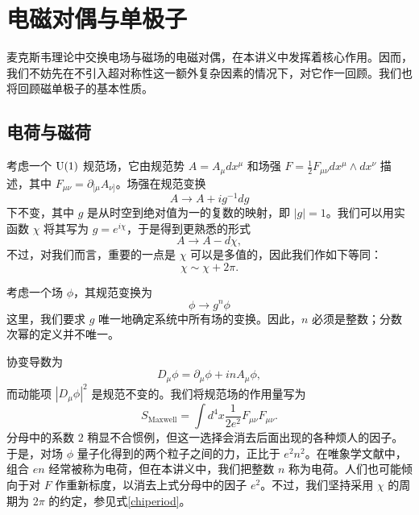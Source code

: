 \section{电磁对偶与单极子}\label{sec:emdual}
麦克斯韦理论中交换电场与磁场的电磁对偶，在本讲义中发挥着核心作用。因而，我们不妨先在不引入超对称性这一额外复杂因素的情况下，对它作一回顾。我们也将回顾磁单极子的基本性质。
\subsection{电荷与磁荷}\label{charges}
考虑一个 ${\mathrm{U}}(1)$ 规范场，它由规范势 $A=A_\mu dx^\mu$ 和场强 $F=\frac12F_{\mu\nu} dx^\mu \wedge dx^\nu$ 描述，其中 $F_{\mu\nu}=\partial_{[\mu} A_{\nu]}$。场强在规范变换
\begin{equation}
A\to A+i g^{-1} dg
\end{equation}
下不变，其中 $g$ 是从时空到绝对值为一的复数的映射，即 $|g|=1$。我们可以用实函数 $\chi$ 将其写为 $g=e^{i\chi}$，于是得到更熟悉的形式
\begin{equation}
A\to A-d\chi,\label{agauge}
\end{equation}
不过，对我们而言，重要的一点是 $\chi$ 可以是多值的，因此我们作如下等同：
\begin{equation}
\chi\sim \chi+2\pi. \label{chiperiod}
\end{equation}

考虑一个场 $\phi$，其规范变换为
\begin{equation}
\phi \to g^n \phi
\end{equation}
这里，我们要求 $g$ 唯一地确定系统中所有场的变换。因此，$n$ 必须是整数；分数次幂的定义并不唯一。

协变导数为
\begin{equation}
D_\mu\phi = \partial_\mu\phi + inA_\mu \phi,
\end{equation}
而动能项 $|D_\mu\phi|^2$ 是规范不变的。我们将规范场的作用量写为
\begin{equation}
S_\text{Maxwell}=\int d^4 x \frac1{2e^2} F_{\mu\nu} F_{\mu\nu}.\label{maxwell}
\end{equation}
分母中的系数 $2$ 稍显不合惯例，但这一选择会消去后面出现的各种烦人的因子。于是，对场 $\phi$ 量子化得到的两个粒子之间的力，正比于 $e^2n^2$。在唯象学文献中，组合 $en$ 经常被称为电荷，但在本讲义中，我们把整数 $n$ 称为电荷。人们也可能倾向于对 $F$ 作重新标度，以消去上式分母中的因子 $e^2$。不过，我们坚持采用 $\chi$ 的周期为 $2\pi$ 的约定，参见式\eqref{chiperiod}。

